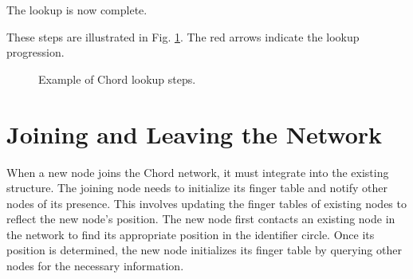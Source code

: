 The lookup is now complete.

These steps are illustrated in Fig. \ref{fig:chord-example-lookup-steps}. The red arrows indicate the lookup progression.

\begin{figure}[htbp]
    \centering
    \caption{Example of Chord lookup steps.}
    \label{fig:chord-example-lookup-steps}
\end{figure}

\section{Joining and Leaving the Network}
When a new node joins the Chord network, it must integrate into the existing structure.
The joining node needs to initialize its finger table and notify other nodes of its presence.
This involves updating the finger tables of existing nodes to reflect the new node's position.
The new node first contacts an existing node in the network to find its appropriate position in the identifier circle.
Once its position is determined, the new node initializes its finger table by querying other nodes for the necessary information.

